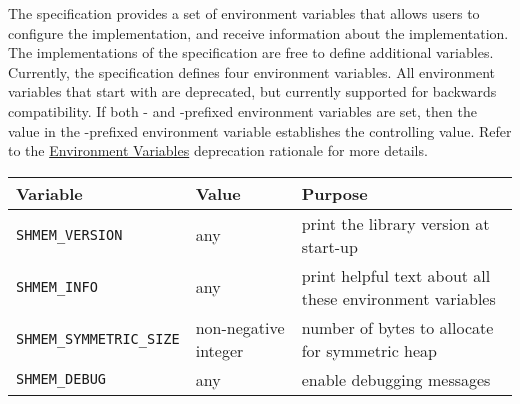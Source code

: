 The \openshmem specification provides a set of environment variables that allows
users to configure the \openshmem implementation, and receive information about
the implementation. The implementations of the specification are free to define
additional variables. Currently, the specification defines four environment
variables. All environment variables that start with  are
deprecated, but currently supported for backwards compatibility.
If both - and -prefixed environment variables
are set, then the value in the -prefixed environment variable
establishes the controlling value. Refer to the
\hyperref[subsec:deprecate-sma-env]{ Environment Variables}
deprecation rationale for more details.

\medskip{}

\begin{tabular}{|l|l|l|}
\hline 
Variable & Value & Purpose\tabularnewline
\hline 
\hline 
\texttt{SHMEM\_VERSION} & any & print the library version at
start-up\tabularnewline
\hline 
\texttt{SHMEM\_INFO} & any & print helpful text about all these environment
variables\tabularnewline
\hline 
\texttt{SHMEM\_SYMMETRIC\_SIZE} & non-negative integer & number of bytes to
allocate for symmetric heap\tabularnewline
\hline 
\texttt{SHMEM\_DEBUG} & any & enable debugging messages\tabularnewline
\hline 
\end{tabular}

\medskip{}
